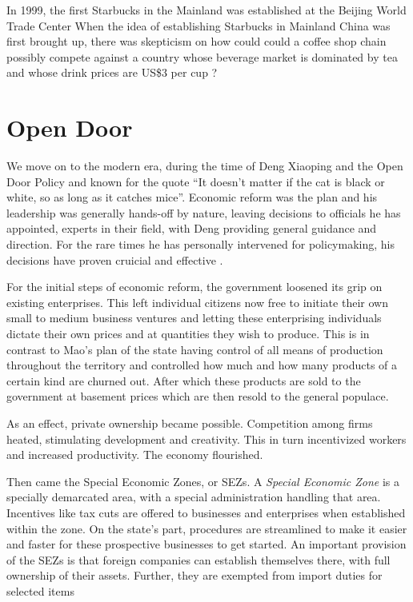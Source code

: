In 1999, the first Starbucks in the Mainland was established at the Beijing
World Trade Center When the idea of establishing Starbucks in Mainland China was
first brought up, there was skepticism on how could could a coffee shop chain
possibly compete against a country whose beverage market is dominated by tea and
whose drink prices are US\$3 per cup \autocite{adamy_eyeing_2006}?


\section{Open Door}


We move on to the modern era, during the time of Deng Xiaoping and the Open Door
Policy and known for the quote ``It doesn't matter if the cat is black or white, so
as long as it catches mice''. Economic reform was the plan and his leadership
was generally hands-off by nature, leaving decisions to officials he has
appointed, experts in their field, with Deng providing general guidance and
direction. For the rare times he has personally intervened for policymaking, his
decisions have proven cruicial and effective \autocite{naughton_deng_1993}.

For the initial steps of economic reform, the government loosened its grip on
existing enterprises. This left individual citizens now free to initiate their own
small to medium business ventures and letting these enterprising individuals dictate
their own prices and at quantities they wish to produce. This is in contrast to
Mao's plan of the state having control of all means of production throughout the
territory and controlled how much and how many products of a certain kind are
churned out. After which these products are sold to the government at basement
prices which are then resold to the general populace.

As an effect, private ownership became possible. Competition among firms heated,
stimulating development and creativity. This in turn incentivized workers and
increased productivity. The economy flourished.


Then came the Special Economic Zones, or SEZs. A \emph{Special Economic Zone} is a
specially demarcated area, with a special administration handling that area.
Incentives like tax cuts are offered to businesses and enterprises when
established within the zone. On the state's part, procedures are streamlined to
make it easier and faster for these prospective businesses to get started.
An important provision of the SEZs is that foreign companies can establish
themselves there, with full ownership of their assets. Further, they are
exempted from import duties for selected items
\autocites{zeng_how_2011}{jaggi_chinas_1996}

